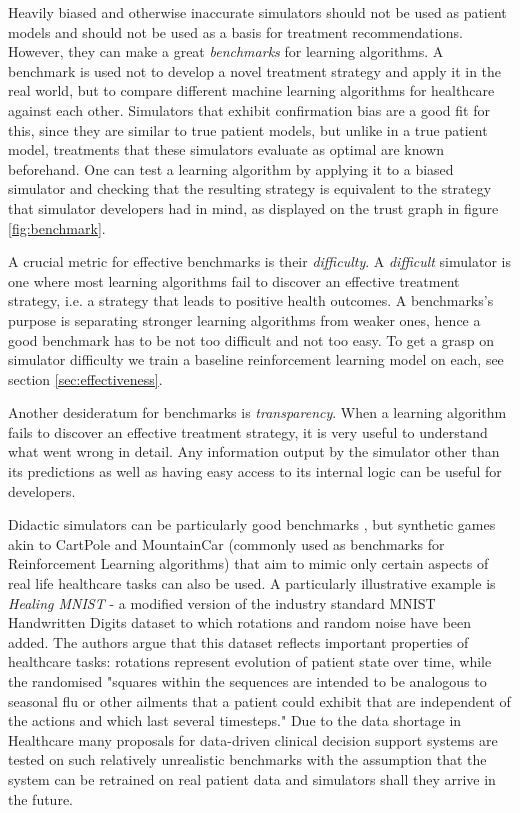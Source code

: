 
Heavily biased and otherwise inaccurate simulators should not be used as patient models and should not be used as a basis for treatment recommendations.
However, they can make a great \emph{benchmarks} for learning algorithms.
A benchmark is used not to develop a novel treatment strategy and apply it in the real world, but to compare different machine learning algorithms for healthcare against each other.
Simulators that exhibit confirmation bias are a good fit for this, since they are similar to true patient models, but unlike in a true patient model, treatments that these simulators evaluate as optimal are known beforehand.
One can test a learning algorithm by applying it to a biased simulator and checking that the resulting strategy is equivalent to the strategy that simulator developers had in mind, as displayed on the trust graph in figure \ref{fig:benchmark}.

A crucial metric for effective benchmarks is their \emph{difficulty}.
A \emph{difficult} simulator is one where most learning algorithms fail to discover an effective treatment strategy, i.e. a strategy that leads to positive health outcomes.
A benchmarks's purpose is separating stronger learning algorithms from weaker ones, hence a good benchmark has to be not too difficult and not too easy.
To get a grasp on simulator difficulty we train a baseline reinforcement learning model on each, see section \ref{sec:effectiveness}.

Another desideratum for benchmarks is \emph{transparency}.
When a learning algorithm fails to discover an effective treatment strategy, it is very useful to understand what went wrong in detail.
Any information output by the simulator other than its predictions as well as having easy access to its internal logic can be useful for developers.

Didactic simulators can be particularly good benchmarks \cite{anthropodidactic}, but synthetic games akin to CartPole \cite{cartpole} and MountainCar \cite{mountain_car} (commonly used as benchmarks for Reinforcement Learning algorithms) that aim to mimic only certain aspects of real life healthcare tasks can also be used.
A particularly illustrative example is \emph{Healing MNIST} \cite{healing-mnist} - a modified version of the industry standard MNIST Handwritten Digits \cite{mnist} dataset to which rotations and random noise have been added.
The authors argue that this dataset reflects important properties of healthcare tasks: rotations represent evolution of patient state over time, while the randomised "squares within the sequences are intended to be analogous to seasonal flu or other ailments that a patient could exhibit that are independent of the actions and which last several timesteps."
Due to the data shortage in Healthcare many proposals for data-driven clinical decision support systems are tested on such relatively unrealistic benchmarks with the assumption that the system can be retrained on real patient data and simulators shall they arrive in the future.

